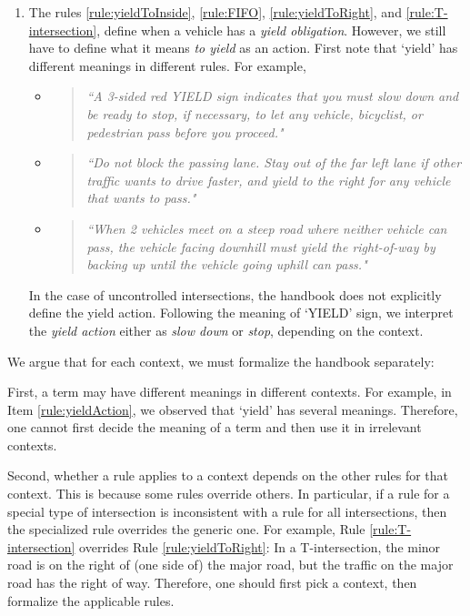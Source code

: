 \begin{enumerate}
\item \label{rule:yieldAction}
The rules \ref{rule:yieldToInside},
\ref{rule:FIFO},
\ref{rule:yieldToRight},
and \ref{rule:T-intersection},
define when a vehicle has a \emph{yield obligation}.
However,
we still have to define what it means \emph{to yield}
as an action.
First note that
`yield' has different meanings in different rules.
For example,
\begin{itemize}
    \item
        \begin{quote}
        {\em ``A 3-sided red YIELD sign indicates that you must slow down and be ready to stop, if necessary, to let any vehicle, bicyclist, or pedestrian pass before you proceed."
        \cite[p. 31]{DMV-California.2019}}
        \end{quote}
    \item
        \begin{quote}
        {\em ``Do not block the passing lane. Stay out of the far left lane if other traffic wants to drive faster, and yield to the right for any vehicle that wants to pass."
        \cite[p. 84]{DMV-California.2019}}
        \end{quote}
    \item
        \begin{quote}
        {\em ``When 2 vehicles meet on a steep road where neither vehicle can pass, the vehicle facing downhill must yield the right-of-way by backing up until the vehicle going uphill can pass."
        \cite[p. 37]{DMV-California.2019}}
        \end{quote}
\end{itemize}
In the case of uncontrolled intersections,
the handbook does not explicitly define the yield action.
Following the meaning of `YIELD' sign,
we interpret the \emph{yield action}
either as \emph{slow down} or \emph{stop},
depending on the context.

\end{enumerate} %

We argue that for each context,
we must formalize the handbook separately:

First,
a term may have different meanings in different contexts.
For example,
in Item \ref{rule:yieldAction},
we observed that `yield' has several meanings.
Therefore,
one cannot first decide the meaning of a term
and then use it in irrelevant contexts.

Second,
whether a rule applies to a context
depends on the other rules for that context.
This is because some rules override others.
In particular,
if a rule for a special type of intersection
is inconsistent with a rule for all intersections,
then the specialized rule overrides the generic one.
For example,
Rule \ref{rule:T-intersection} overrides Rule \ref{rule:yieldToRight}:
In a T-intersection,
the minor road is on the right of (one side of) the major road,
but the traffic on the major road has the right of way.
Therefore,
one should first pick a context,
then formalize the applicable rules.

